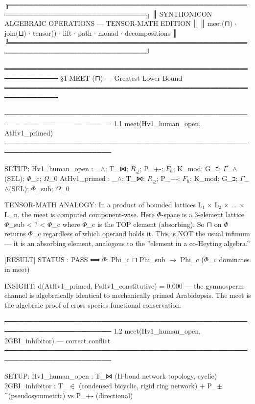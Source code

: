 \documentclass[12pt,a4paper]{article}
\begin{document}
╔══════════════════════════════════════════════════════════════════════════════╗
║          SYNTHONICON ALGEBRAIC OPERATIONS --- TENSOR-MATH EDITION             ║
║  meet(⊓) $\cdot$ join(⊔) $\cdot$ tensor(\otimes) $\cdot$ lift $\cdot$ path $\cdot$ monad $\cdot$ decompositions     ║
╚══════════════════════════════════════════════════════════════════════════════╝

━━━━━━━━━━━━━━━━━━━━━━━━━━━━━━━━━━━━━━━━━━━━━━━━━━━━━━━━━━━━━━━━━━━━━━━━
§1  MEET  (⊓)  ---  Greatest Lower Bound
━━━━━━━━━━━━━━━━━━━━━━━━━━━━━━━━━━━━━━━━━━━━━━━━━━━━━━━━━━━━━━━━━━━━━━━━

────────────────────────────────────────────────────────────────────────
1.1  meet(Hv1\_human\_open, AtHv1\_primed)
────────────────────────────────────────────────────────────────────────

SETUP:
Hv1\_human\_open  : \langleD\_$\land$; T\_⋈; $R_{\supseteq}$; P\_+-; $F_{\hbar}$; K\_mod; G\_ב; $\Gamma$\_$\land$(SEL); $\Phi$\_c; $\Omega$\_0\rangle
AtHv1\_primed    : \langleD\_$\land$; T\_⋈; $R_{\supseteq}$; P\_+-; $F_{\hbar}$; K\_mod; G\_ב; $\Gamma$\_$\land$(SEL); $\Phi$\_sub; $\Omega$\_0\rangle

TENSOR-MATH ANALOGY:
In a product of bounded lattices L₁ $\times$ L₂ $\times$ ... $\times$ L\_n,
the meet is computed component-wise. Here $\Phi$-space is a 3-element
lattice  $\Phi$\_sub \textless{} ? \textless{} $\Phi$\_c  where $\Phi$\_c is the TOP element (absorbing).
So ⊓ on $\Phi$ returns $\Phi$\_c regardless of which operand holds it.
This is NOT the usual infimum --- it is an absorbing element,
analogous to the ''\top element in a co-Heyting algebra.''

{[}RESULT{]}
STATUS  : PASS
⟹  $\Phi$: Phi\_c ⊓ Phi\_sub $\rightarrow$ Phi\_c ($\Phi$\_c dominates in meet)

INSIGHT:
d(AtHv1\_primed, PsHv1\_constitutive) = 0.000 --- the gymnosperm
channel is algebraically identical to mechanically primed Arabidopsis.
The meet is the algebraic proof of cross-species functional conservation.

────────────────────────────────────────────────────────────────────────
1.2  meet(Hv1\_human\_open, 2GBI\_inhibitor) --- correct conflict
────────────────────────────────────────────────────────────────────────

SETUP:
Hv1\_human\_open  : T\_⋈  (H-bond network topology, cyclic)
2GBI\_inhibitor  : T\_$\in$  (condensed bicyclic, rigid ring network)
+ P\_$\pm$\^{}\psi (pseudosymmetric) vs P\_+- (directional)
\end{document}

